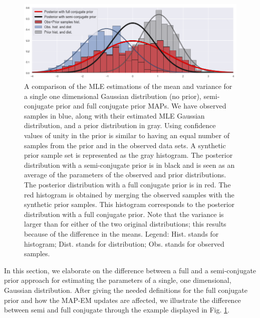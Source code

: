  \label{Appendix:full_conjugate}

\begin{figure}
    \includegraphics[width=\textwidth]{./Fig/LowRes/Full_vs_Semi_conjugate.png}
    \caption{A comparison of the MLE estimations of the mean and variance for a single one dimensional Gaussian distribution (no prior), semi-conjugate prior and full conjugate prior MAPs. We have observed samples in blue, along with their estimated MLE Gaussian distribution, and a prior distribution in gray. Using confidence values of unity in the prior is similar to having an equal number of samples from the prior and in the observed data sets. A synthetic prior sample set is represented as the gray histogram. The posterior distribution with a semi-conjugate prior is in black and is seen as an average of the parameters of the observed and prior distributions. The posterior distribution with a full conjugate prior is in red. The red histogram is obtained by merging the observed samples with the synthetic prior samples. This histogram corresponds to the posterior distribution with a full conjugate prior. Note that the variance is larger than for either of the two original distributions; this results because of  the difference in the means. Legend: Hist. stands for histogram; Dist. stands for distribution; Obs. stands for observed samples.}
    \label{Full_vs_Semi_conjugate}
\end{figure}

In this section, we elaborate on the difference between a full and a semi-conjugate prior approach for estimating the parameters of a single, one dimensional, Gaussian distribution. After giving the needed definitions for the full conjugate prior and how the MAP-EM updates are affected, we illustrate the difference between semi and full conjugate through the example displayed in Fig. \ref{Full_vs_Semi_conjugate}.

